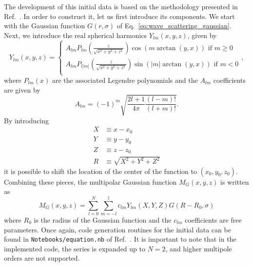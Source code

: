 The development of this initial data is based on the methodology presented in Ref.~\cite{PhysRevD.87.043513}. In order to construct it, let us first introduce its components. We start with the Gaussian function $G(r, \sigma)$ of Eq.~\eqref{eq:wave_scattering_gaussian}. Next, we introduce the real spherical harmonics $Y_{lm}(x,y,z)$, given by
%
\begin{equation}
  Y_{lm}(x, y, z) =
  \begin{cases}
    A_{lm} P_{lm}\left( \frac{z}{\sqrt{x^2 + y^2 + z^2}} \right) \cos(m \arctan(y,x)) \text{ if } m \geq 0  \\
    A_{lm} P_{l|m|}\left( \frac{z}{\sqrt{x^2 + y^2 + z^2}} \right) \sin(|m| \arctan(y,x)) \text{ if } m < 0 \\
  \end{cases}
  ,
  \label{eq:wave_scattering_real_spherical_harmonics}
\end{equation}
%
where $P_{lm}(x)$ are the associated Legendre polynomials and the $A_{lm}$ coefficients are given by
%
\begin{equation}
  A_{lm} = (-1)^m \sqrt{\frac{2 l + 1}{4\pi} \frac{(l-m)!}{(l+m)!}}.
  \label{eq:wave_scattering_real_spherical_harmonics_coeffs}
\end{equation}
%
By introducing
%
\begin{align}
  X & \equiv x - x_0 \label{eq:wave_scattering_real_spherical_harmonics_shifted_x}                \\
  Y & \equiv y - y_0 \label{eq:wave_scattering_real_spherical_harmonics_shifted_y}                \\
  Z & \equiv z - z_0 \label{eq:wave_scattering_real_spherical_harmonics_shifted_z}                \\
  R & \equiv \sqrt{X^2 + Y^2 + Z^2} \label{eq:wave_scattering_real_spherical_harmonics_shifted_r}
\end{align}
%
it is possible to shift the location of the center of the function to $(x_0,y_0,z_0)$. Combining these pieces, the multipolar Gaussian function $M_G(x,y,z)$ is written as
%
\begin{equation}
  M_G(x, y, z) = \sum_{l=0}^{N}\sum_{m = -l}^{l} c_{l m} Y_{l m}(X,Y,Z) G(R-R_0,\sigma)
  \label{eq:wave_scattering_multipolar_gaussian}
\end{equation}
%
where $R_0$ is the radius of the Gaussian function and the $c_{l m}$ coefficients are free parameters. Once again, code generation routines for the initial data can be found in \texttt{Notebooks/equation.nb} of Ref.~\cite{}. It is important to note that in the implemented code, the series is expanded up to $N = 2$, and higher multipole orders are not supported.


